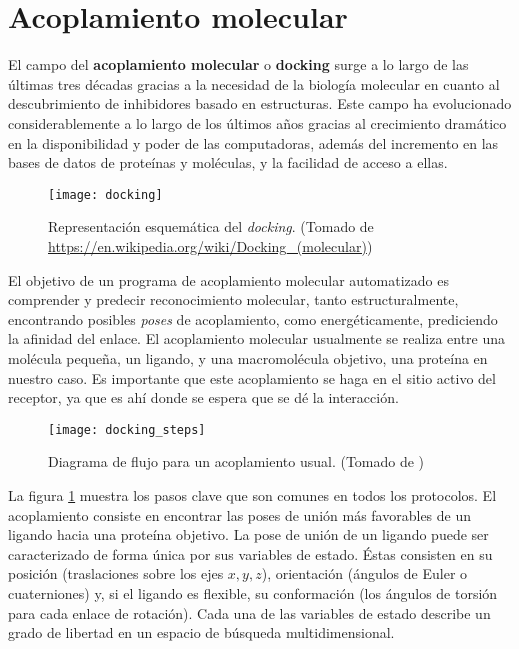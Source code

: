 \section{Acoplamiento molecular}
El campo del \textbf{acoplamiento molecular} o
\textbf{docking} surge a lo largo de las últimas tres décadas gracias a la
necesidad de la biología molecular en cuanto al descubrimiento de
inhibidores basado en estructuras. Este campo ha evolucionado
considerablemente a lo largo de los últimos años gracias al
crecimiento dramático en la disponibilidad y poder de las
computadoras, además del incremento en las bases de datos de proteínas
y moléculas, y la facilidad de acceso a ellas.\cite{kukol}

\begin{figure}[H]
  \texttt{[image: docking]} \centering
  \caption{Representación esquemática del \textit{docking}.  (Tomado de
    \url{https://en.wikipedia.org/wiki/Docking_(molecular)})}
\end{figure}

El objetivo de un programa de acoplamiento molecular automatizado es
comprender y predecir reconocimiento molecular, tanto
estructuralmente, encontrando posibles \textit{poses} de acoplamiento,
como energéticamente, prediciendo la afinidad del enlace. El
acoplamiento molecular usualmente se realiza entre una molécula
pequeña, un ligando, y una macromolécula objetivo, una proteína en
nuestro caso. Es importante que este acoplamiento se haga en el sitio
activo del receptor, ya que es ahí donde se espera que se dé la
interacción.

\begin{center}
\begin{figure}[H]
  \texttt{[image: docking\_steps]}
  \caption{Diagrama de flujo para un acoplamiento usual.  (Tomado de
    \cite{kukol})}
  \label{fig:docking_flowchart}
\end{figure}
\end{center}

La figura \ref{fig:docking_flowchart} muestra los pasos clave que son
comunes en todos los protocolos. El acoplamiento consiste en encontrar
las poses de unión más favorables de un ligando hacia una proteína
objetivo. La pose de unión de un ligando puede ser caracterizado de
forma única por sus variables de estado. Éstas consisten en su
posición (traslaciones sobre los ejes $x, y, z$), orientación (ángulos
de Euler o cuaterniones) y, si el ligando es flexible, su conformación
(los ángulos de torsión para cada enlace de rotación). Cada una de las
variables de estado describe un grado de libertad en un espacio de
búsqueda multidimensional.

